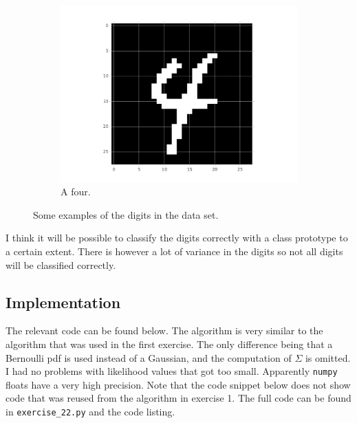 \documentclass[paper=a4, fontsize=10pt]{scrartcl} %
\numberwithin{equation}{section} %
\numberwithin{figure}{section} %
\numberwithin{table}{section} %
\begin{document}
\begin{figure}[H]
        ~ %
        \begin{subfigure}[b]{0.3\textwidth}
                \includegraphics[width=\textwidth]{four}
                \caption{A four.}
        \end{subfigure}
        \caption{Some examples of the digits in the data set.}
        \label{digits}
\end{figure}

I think it will be possible to classify the digits correctly with a class prototype to a certain extent. There is however a lot of variance in the digits so not all digits will be classified correctly.

\subsection{Implementation}
The relevant code can be found below. The algorithm is very similar to the algorithm that was used in the first exercise. The only difference being that a Bernoulli pdf is used instead of a Gaussian, and the computation of $\Sigma$ is omitted. I had no problems with likelihood values that got too small. Apparently \verb|numpy| floats have a very high precision. Note that the code snippet below does not show code that was reused from the algorithm in exercise 1. The full code can be found in \verb|exercise_22.py| and the code listing.
\end{document}
